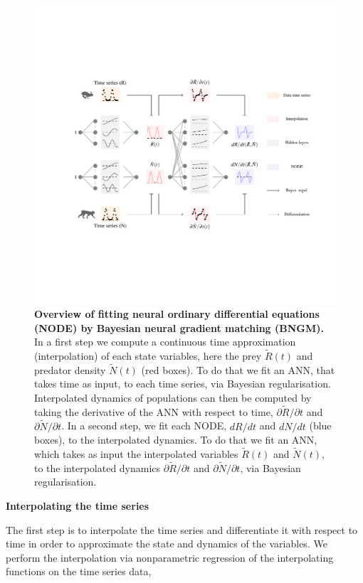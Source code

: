 \documentclass[11pt, oneside]{article}
\begin{document}
\newpage
\begin{figure}[H]
\includegraphics[width=\linewidth,page=1]{figures/main.pdf}
\vspace{-3cm}
\caption{
    \textbf{Overview of fitting neural ordinary differential equations (NODE) by Bayesian neural gradient matching (BNGM).}
    In a first step we compute a continuous time approximation (interpolation) of each state variables, here the prey $\tilde{R}(t)$ and predator density $\tilde{N}(t)$ (red boxes).
    To do that we fit an ANN, that takes time as input, to each time series, via Bayesian regularisation.
    Interpolated dynamics of populations can then be computed by taking the derivative of the ANN with respect to time, $\partial\tilde{R}/\partial t$ and $\partial\tilde{N}/\partial t$.
    In a second step, we fit each NODE, $dR/dt$ and $dN/dt$ (blue boxes), to the interpolated dynamics.
    To do that we fit an ANN, which takes as input the interpolated variables $\tilde{R}(t)$ and $\tilde{N}(t)$, to the interpolated dynamics $\partial\tilde{R}/\partial t$ and $\partial\tilde{N}/\partial t$, via Bayesian regularisation.
}
\end{figure}
\newpage

\textbf{Interpolating the time series}

The first step is to interpolate the time series and differentiate it with respect to time in order to approximate the state and dynamics of the variables.
We perform the interpolation via nonparametric regression of the interpolating functions on the time series data,
\end{document}

